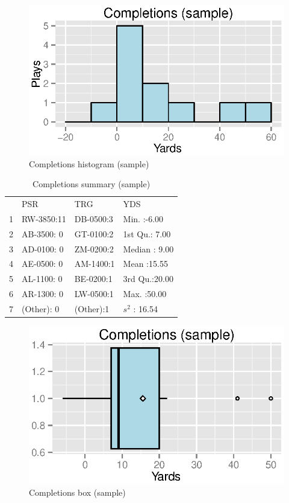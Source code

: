 \documentclass{exam}
\begin{document}
  \begin{figure}[H]
    \centering
    \includegraphics{figures/nfl/sample_completions_histogram.eps}
    \caption{Completions histogram (sample)}
  \end{figure}

  \begin{table}[H]
    \centering
    \begin{tabular}{rlll}
      \toprule
      \midrule
         & PSR        & TRG       & YDS \\
      1  & RW-3850:11 & DB-0500:3 & Min.   :-6.00   \\
      2  & AB-3500: 0 & GT-0100:2 & 1st Qu.: 7.00   \\
      3  & AD-0100: 0 & ZM-0200:2 & Median : 9.00   \\
      4  & AE-0500: 0 & AM-1400:1 & Mean   :15.55   \\
      5  & AL-1100: 0 & BE-0200:1 & 3rd Qu.:20.00   \\
      6  & AR-1300: 0 & LW-0500:1 & Max.   :50.00   \\
      7  & (Other): 0 & (Other):1 & $s^2$  : 16.54 \\
      \bottomrule
    \end{tabular}
    \caption{Completions summary (sample)}
  \end{table}

  \begin{figure}[H]
    \centering
    \includegraphics{figures/nfl/sample_completions_box.eps}
    \caption{Completions box (sample)}
  \end{figure}
\end{document}
